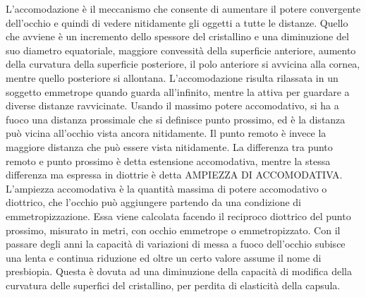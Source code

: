 L’accomodazione è il meccanismo che consente di aumentare il potere convergente dell’occhio e quindi di vedere nitidamente gli oggetti a tutte le distanze. Quello che avviene è un incremento dello spessore del cristallino e una diminuzione del suo diametro equatoriale, maggiore convessità della superficie anteriore, aumento della curvatura della superficie posteriore, il polo anteriore si avvicina alla cornea, mentre quello posteriore si allontana.
L’accomodazione risulta rilassata in un soggetto emmetrope quando guarda all’infinito, mentre la attiva per guardare a diverse distanze ravvicinate. Usando il massimo potere accomodativo, si ha a fuoco una distanza prossimale che si definisce punto prossimo, ed è la distanza può vicina all’occhio vista ancora nitidamente. Il punto remoto è invece la maggiore distanza che può essere vista nitidamente. La differenza tra punto remoto e punto prossimo è detta estensione accomodativa, mentre la stessa differenza ma espressa in diottrie è detta AMPIEZZA DI ACCOMODATIVA. L’ampiezza accomodativa è la quantità massima di potere accomodativo o diottrico, che l’occhio può aggiungere partendo da una condizione di emmetropizzazione. Essa viene calcolata facendo il reciproco diottrico del punto prossimo, misurato in metri, con occhio emmetrope o emmetropizzato.
Con il passare degli anni la capacità di variazioni di messa a fuoco dell’occhio subisce una lenta e continua riduzione ed oltre un certo valore assume il nome di presbiopia. Questa è dovuta ad una diminuzione della capacità di modifica della curvatura delle superfici del cristallino, per perdita di elasticità della capsula.

